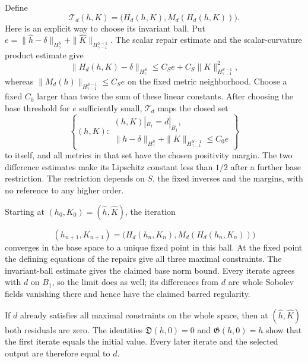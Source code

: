 \documentclass[
  english,
  11pt,
  reqno]{amsart}
\begin{document}
Define \[
\mathcal T_d(h,K)
=\bigl(H_d(h,K),M_d(H_d(h,K))\bigr).
\] Here is an explicit way to choose its invariant ball. Put
\(e=\|\widehat h-\delta\|_{H^S_\gamma}
+\|\widehat K\|_{H^{S-1}_{\gamma-1}}\). The scalar repair estimate and
the scalar-curvature product estimate give \[
\|H_d(h,K)-\delta\|_{H^S_\gamma}
\le C_S e+C_S\|K\|_{H^{S-1}_{\gamma-1}}^2,
\] whereas \(\|M_d(h)\|_{H^{S-1}_{\gamma-1}}\le C_S e\) on the fixed
metric neighborhood. Choose a fixed \(C_0\) larger than twice the sum of
these linear constants. After choosing the base threshold for \(e\)
sufficiently small, \(\mathcal T_d\) maps the closed set \[
\left\{(h,K):
\begin{gathered}
(h,K)|_{B_1}=d|_{B_1},\\
\|h-\delta\|_{H^S_\gamma}
+\|K\|_{H^{S-1}_{\gamma-1}}\le C_0e
\end{gathered}
\right\}
\] to itself, and all metrics in that set have the chosen positivity
margin. The two difference estimates make its Lipschitz constant less
than \(1/2\) after a further base restriction. The restriction depends
on \(S\), the fixed inverses and the margins, with no reference to any
higher order.

Starting at \((h_0,K_0)=(\widehat h,\widehat K)\), the iteration

\label{eq:online-extension-base-iteration} \[
(h_{n+1},K_{n+1})
=\bigl(H_d(h_n,K_n),M_d(H_d(h_n,K_n))\bigr)
\] converges in the base space to a unique fixed point in this ball. At
the fixed point the defining equations of the repairs give all three
maximal constraints. The invariant-ball estimate gives the claimed base
norm bound. Every iterate agrees with \(d\) on \(B_1\), so the limit
does as well; its differences from \(d\) are whole Sobolev fields
vanishing there and hence have the claimed barred regularity.

If \(d\) already satisfies all maximal constraints on the whole space,
then at \((\widehat h,\widehat K)\) both residuals are zero. The
identities \(\mathfrak D(h,0)=0\) and \(\mathfrak G(h,0)=h\) show that
the first iterate equals the initial value. Every later iterate and the
selected output are therefore equal to \(d\).
\end{document}
